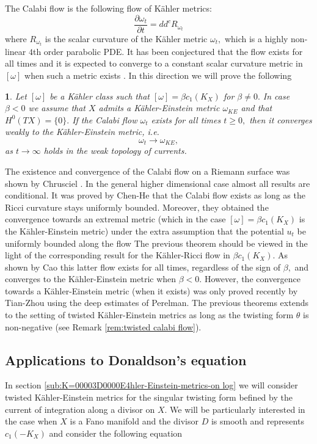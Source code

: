 \documentclass[11pt,oneside,english]{amsart}
\numberwithin{equation}{section}
\numberwithin{figure}{section}
\theoremstyle{plain}
\newtheorem{thm}{\protect\theoremname}[section]
\theoremstyle{plain}
\theoremstyle{plain}
\theoremstyle{plain}
\theoremstyle{remark}
\theoremstyle{definition}
\providecommand{\theoremname}{Theorem}
\begin{document}
The Calabi flow\emph{ }\cite{ca} is the following flow of Kähler
metrics: 
\[
\frac{\partial\omega_{t}}{\partial t}=dd^{c}R_{\omega_{t}}
\]
 where $R_{\omega_{t}}$ is the scalar curvature of the Kähler metric
$\omega_{t},$ which is a highly non-linear $4$th order parabolic
PDE. It has been conjectured that the flow exists for all times and
it is expected to converge to a constant scalar curvature metric in
$[\omega]$ when such a metric exists \cite{ca,do}. In this direction
we will prove the following 
\begin{thm}
\label{thm:conv of cal intro}Let $[\omega]$ be a Kähler class such
that $[\omega]=\beta c_{1}(K_{X})$ for $\beta\neq0.$ In case $\beta<0$
we assume that $X$ admits a Kähler-Einstein metric $\omega_{KE}$
and that $H^{0}(TX)=\{0\}.$ If the Calabi flow $\omega_{t}$ exists
for all times $t\geq0,$ then it converges weakly to the Kähler-Einstein
metric, i.e. 
\[
\omega_{t}\rightarrow\omega_{KE},
\]
 as $t\rightarrow\infty$ holds in the weak topology of currents. 
\end{thm}
The existence and convergence of the Calabi flow on a Riemann surface
was shown by Chrusciel \cite{chr}. In the general higher dimensional
case almost all results are conditional. It was proved by Chen-He
\cite{c-h} that the Calabi flow exists as long as the Ricci curvature
stays uniformly bounded. Moreover, they obtained the convergence towards
an extremal metric (which in the case $[\omega]=\beta c_{1}(K_{X})$
is the Kähler-Einstein metric) under the extra assumption that the
potential $u_{t}$ be uniformly bounded along the flow The previous
theorem should be viewed in the light of the corresponding result
for the Kähler-Ricci flow in $\beta c_{1}(K_{X}).$ As shown by Cao
\cite{cao-1} this latter flow exists for all times, regardless of
the sign of $\beta,$ and converges to the Kähler-Einstein metric
when $\beta<0.$ However, the convergence towards a Kähler-Einstein
metric (when it exists) was only proved recently by Tian-Zhou \cite{t-z}
using the deep estimates of Perelman. The previous theorems extends
to the setting of twisted Kähler-Einstein metrics as long as the twisting
form $\theta$ is non-negative (see Remark \ref{rem:twisted calabi flow}).

\subsection{Applications to Donaldson's equation}

In section \ref{sub:K=00003D0000E4hler-Einstein-metrics-on log} we
will consider twisted Kähler-Einstein metrics for the singular twisting
form befined by the current of integration along a divisor on $X.$
We will be particularly interested in the case when $X$ is a Fano
manifold and the divisor $D$ is smooth and represents $c_{1}(-K_{X})$
and consider the following equation
\end{document}
